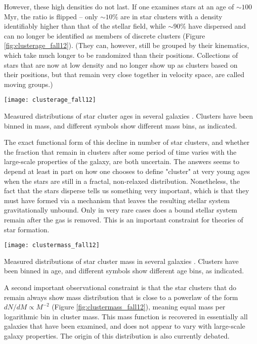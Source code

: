 However, these high densities do not last. If one examines stars at an age of $\sim 100$ Myr, the ratio is flipped -- only $\sim 10\%$ are in star clusters with a density identifiably higher than that of the stellar field, while $\sim 90\%$ have dispersed and can no longer be identified as members of discrete clusters (Figure \ref{fig:clusterage_fall12}). (They can, however, still be grouped by their kinematics, which take much longer to be randomized than their positions. Collections of stars that are now at low density and no longer show up as clusters based on their positions, but that remain very close together in velocity space, are called moving groups.)

\begin{marginfigure}
\texttt{[image: clusterage\_fall12]}
\caption[Star cluster age distributions]{
\label{fig:clusterage_fall12}
Measured distributions of star cluster ages in several galaxies \citep{fall12a}. Clusters have been binned in mass, and different symbols show different mass bins, as indicated.
}
\end{marginfigure}

The exact functional form of this decline in number of star clusters, and whether the fraction that remain in clusters after some period of time varies with the large-scale properties of the galaxy, are both uncertain. The answers seems to depend at least in part on how one chooses to define "cluster" at very young ages when the stars are still in a fractal, non-relaxed distribution. Nonetheless, the fact that the stars disperse tells us something very important, which is that they must have formed via a mechanism that leaves the resulting stellar system gravitationally unbound. Only in very rare cases does a bound stellar system remain after the gas is removed. This is an important constraint for theories of star formation.

\begin{marginfigure}
\texttt{[image: clustermass\_fall12]}
\caption[Star cluster mass distributions]{
\label{fig:clustermass_fall12}
Measured distributions of star cluster mass in several galaxies \citep{fall12a}. Clusters have been binned in age, and different symbols show different age bins, as indicated.
}
\end{marginfigure}

A second important observational constraint is that the star clusters that do remain always show mass distribution that is close to a powerlaw of the form $dN/dM \propto M^{-2}$ (Figure \ref{fig:clustermass_fall12}), meaning equal mass per logarithmic bin in cluster mass. This mass function is recovered in essentially all galaxies that have been examined, and does not appear to vary with large-scale galaxy properties. The origin of this distribution is also currently debated.


